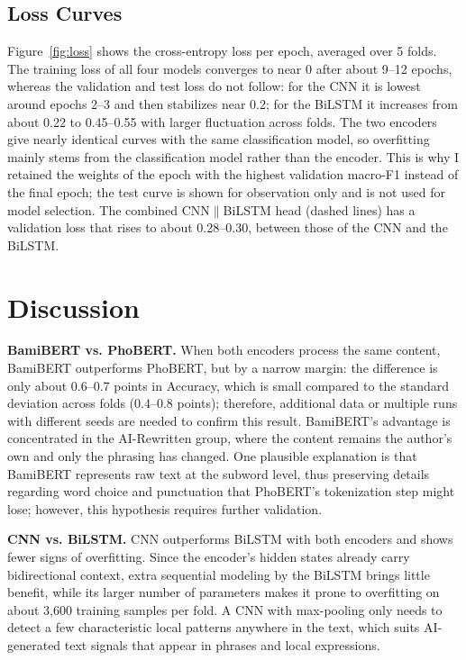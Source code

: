 \documentclass[conference,a4paper]{IEEEtran}
\begin{document}
\subsection{Loss Curves}
Figure~\ref{fig:loss} shows the cross-entropy loss per epoch, averaged over 5 folds. The training loss of all four models converges to near 0 after about 9--12 epochs, whereas the validation and test loss do not follow: for the CNN it is lowest around epochs 2--3 and then stabilizes near 0.2; for the BiLSTM it increases from about 0.22 to 0.45--0.55 with larger fluctuation across folds. The two encoders give nearly identical curves with the same classification model, so overfitting mainly stems from the classification model rather than the encoder. This is why I retained the weights of the epoch with the highest validation macro-F1 instead of the final epoch; the test curve is shown for observation only and is not used for model selection. The combined CNN$\|$BiLSTM head (dashed lines) has a validation loss that rises to about 0.28--0.30, between those of the CNN and the BiLSTM.



\section{Discussion}
\label{sec:discussion}
\textbf{BamiBERT vs. PhoBERT.} When both encoders process the same content, BamiBERT outperforms PhoBERT, but by a narrow margin: the difference is only about 0.6--0.7 points in Accuracy, which is small compared to the standard deviation across folds (0.4--0.8 points); therefore, additional data or multiple runs with different seeds are needed to confirm this result. BamiBERT's advantage is concentrated in the AI-Rewritten group, where the content remains the author's own and only the phrasing has changed. One plausible explanation is that BamiBERT represents raw text at the subword level, thus preserving details regarding word choice and punctuation that PhoBERT's tokenization step might lose; however, this hypothesis requires further validation.

\textbf{CNN vs. BiLSTM.} CNN outperforms BiLSTM with both encoders and shows fewer signs of overfitting. Since the encoder's hidden states already carry bidirectional context, extra sequential modeling by the BiLSTM brings little benefit, while its larger number of parameters makes it prone to overfitting on about 3,600 training samples per fold. A CNN with max-pooling only needs to detect a few characteristic local patterns anywhere in the text, which suits AI-generated text signals that appear in phrases and local expressions.
\end{document}
